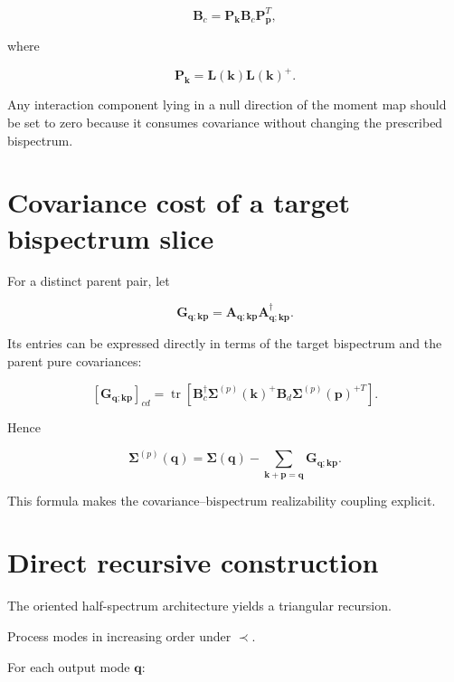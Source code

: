 \documentclass[
  11pt,
  a4paper,
]{article}
\begin{document}
\[
\boxed{
\boldsymbol B_c
=
\boldsymbol P_{\boldsymbol k}
\boldsymbol B_c
\boldsymbol P_{\boldsymbol p}^T
},
\]

where

\[
\boldsymbol P_{\boldsymbol k}
=
\boldsymbol L(\boldsymbol k)
\boldsymbol L(\boldsymbol k)^+.
\]

Any interaction component lying in a null direction of the moment map
should be set to zero because it consumes covariance without changing
the prescribed bispectrum.

\section{Covariance cost of a target bispectrum
slice}\label{covariance-cost-of-a-target-bispectrum-slice}

For a distinct parent pair, let

\[
\boldsymbol G_{\boldsymbol q;\boldsymbol k\boldsymbol p}
=
\boldsymbol A_{\boldsymbol q;\boldsymbol k\boldsymbol p}
\boldsymbol A_{\boldsymbol q;\boldsymbol k\boldsymbol p}^\dagger.
\]

Its entries can be expressed directly in terms of the target bispectrum
and the parent pure covariances:

\[
\boxed{
\left[
\boldsymbol G_{\boldsymbol q;\boldsymbol k\boldsymbol p}
\right]_{cd}
=
\operatorname{tr}\!\left[
\boldsymbol B_c^\dagger
\boldsymbol\Sigma^{(p)}(\boldsymbol k)^+
\boldsymbol B_d
\boldsymbol\Sigma^{(p)}(\boldsymbol p)^{+T}
\right]
}.
\]

Hence

\[
\boxed{
\boldsymbol\Sigma^{(p)}(\boldsymbol q)
=
\boldsymbol\Sigma(\boldsymbol q)
-
\sum_{\boldsymbol k+\boldsymbol p=\boldsymbol q}
\boldsymbol G_{\boldsymbol q;\boldsymbol k\boldsymbol p}
}.
\]

This formula makes the covariance--bispectrum realizability coupling
explicit.

\section{Direct recursive
construction}\label{direct-recursive-construction}

The oriented half-spectrum architecture yields a triangular recursion.

Process modes in increasing order under \(\prec\).

For each output mode \(\boldsymbol q\):
\end{document}
